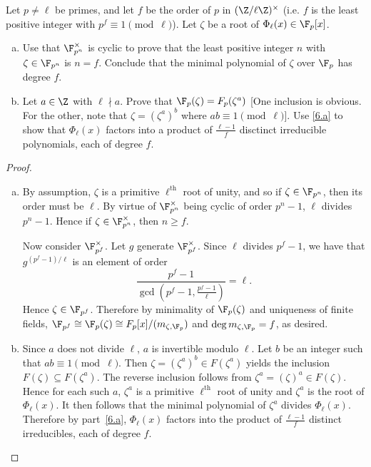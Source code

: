 \documentclass[10pt]{amsart}
\begin{document}
\begin{thm}
  Let $p \neq \ell$ be primes, and let $f$ be the order of $p$ in $(\Z/\ell\Z)^\times$ (i.e. $f$ is the least positive integer with $p^f \equiv 1 \pmod{\ell}$).
  Let $\zeta$ be a root of $\Phi_\ell(x) \in \F_p[x]$.
  \begin{enumerate}[(a)]
   \item\label{6.a}
     Use that $\F_{p^n}^\times$ is cyclic to prove that the least positive integer $n$ with $\zeta \in \F_{p^n}$ is $n = f$.
     Conclude that the minimal polynomial of $\zeta$ over $\F_p$ has degree $f$.
   \item
     Let $a \in \Z$ with $\ell \nmid a$.
     Prove that $\F_p(\zeta) = F_p(\zeta^a)$ [One inclusion is obvious.
       For the other, note that $\zeta = (\zeta^a)^b$ where $ab \equiv 1 \pmod{\ell}$].
     Use \eqref{6.a} to show that $\Phi_\ell(x)$ factors into a product of $\frac{\ell - 1}{f}$ disctinct irreducible polynomials, each of degree $f$.
  \end{enumerate}
  
  \begin{proof}
    \begin{enumerate}[(a)]
        \item
          By assumption, $\zeta$ is a primitive $\ell^\text{th}$ root of unity, and so if $\zeta \in \F_{p^n}$, then its order must be $\ell$.
          By virtue of $\F_{p^n}^\times$ being cyclic of order $p^n - 1$, $\ell$ divides $p^n - 1$.
          Hence if $\zeta \in \F_{p^n}^\times$, then $n \geq f$.
          
          Now consider $\F_{p^f}^\times$.
          Let $g$ generate $\F_{p^f}^\times$.
          Since $\ell$ divides $p^f - 1$, we have that $g^{(p^f - 1)/\ell}$ is an element of order 
          $$\frac{p^f - 1}{\gcd(p^f - 1, \frac{p^f - 1}{\ell})} = \ell.$$
          Hence $\zeta \in \F_{p^f}$.
          Therefore by minimality of $\F_p(\zeta)$ and uniqueness of finite fields, $\F_{p^f} \cong \F_p(\zeta) \cong F_{p}[x]/(m_{\zeta,\F_p})$ and $\deg{m_{\zeta,\F_p}} = f$, as desired.
        \item
          Since $a$ does not divide $\ell$, $a$ is invertible modulo $\ell$.
          Let $b$ be an integer such that $ab \equiv 1 \pmod{\ell}$.
          Then $\zeta = (\zeta^a)^{b} \in F(\zeta^a)$ yields the inclusion $F(\zeta) \subseteq F(\zeta^a)$.
          The reverse inclusion follows from $\zeta^a = (\zeta)^a \in F(\zeta)$.
          Hence for each such $a$, $\zeta^a$ is a primitive $\ell^\text{th}$ root of unity and $\zeta^a$ is the root of $\Phi_\ell(x)$.
          It then follows that the minimal polynomial of $\zeta^a$ divides $\Phi_\ell(x)$.
          Therefore by part~\eqref{6.a}, $\Phi_\ell(x)$ factors into the product of $\frac{\ell - 1}{f}$ distinct irreducibles, each of degree $f$.
    \end{enumerate}    
  \end{proof}
\end{thm}
\end{document}
